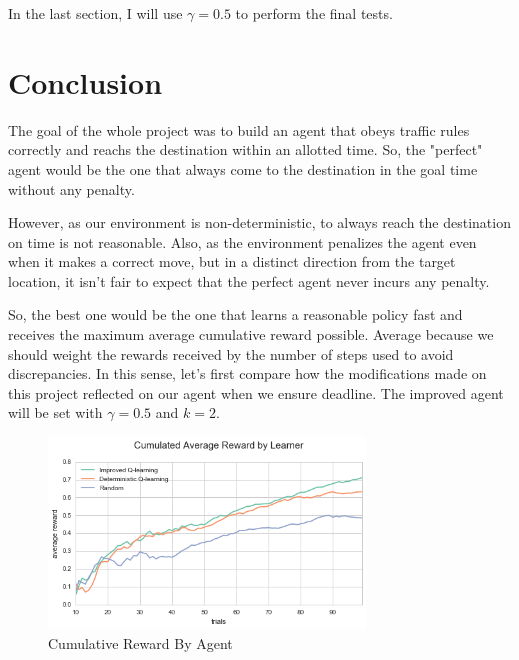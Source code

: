 \documentclass[a4paper]{article}
\begin{document}
In the last section, I will use $\gamma = 0.5$ to perform the final tests.


\section{Conclusion}
\label{sec:conclusion}

The goal of the whole project was to build an agent that obeys traffic rules correctly and reachs the destination within an allotted time. So, the "perfect" agent would be the one that always come to the destination in the goal time without any penalty.

However, as our environment is non-deterministic, to always reach the destination on time is not reasonable. Also, as the environment penalizes the agent even when it makes a correct move, but in a distinct direction from the target location, it isn't fair to expect that the perfect agent never incurs any penalty.

So, the best one would be the one that learns a reasonable policy fast and receives the maximum average cumulative reward possible. Average because we should weight the rewards received by the number of steps used to avoid discrepancies. In this sense, let's first compare how the modifications made on this project reflected on our agent when we ensure deadline. The improved agent will be set with $\gamma=0.5$ and $k=2$.


\begin{figure}[ht!]
\centering
\includegraphics[width=0.75\textwidth]{images/performance_comparition.png}
\caption{\label{fig:perf_compr}Cumulative Reward By Agent}
\end{figure}
\end{document}

